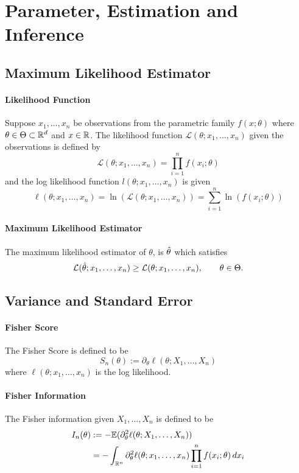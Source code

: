 \section{Parameter, Estimation and Inference}

\subsection{Maximum Likelihood Estimator}
\paragraph{Likelihood Function}
Suppose \(x_1, \dots, x_n\) be observations from the parametric family \(f(x; \theta)\) where \(\theta \in \Theta \subset \mathbb{R}^d\) and \(x \in \mathbb{R}\). The likelihood function \(\mathcal{L}(\theta; x_1, \dots, x_n)\) given the observations is defined by
\[\mathcal{L}(\theta; x_1, \dots, x_n) = \prod_{i=1}^n f(x_i;\theta) \]
and the log likelihood function \(l(\theta; x_1, \dots, x_n)\) is given
\[\ell(\theta; x_1, \dots, x_n) = \ln(\mathcal{L}(\theta; x_1, \dots, x_n)) = \sum_{i=1}^n \ln(f(x_i; \theta))\]

\paragraph{Maximum Likelihood Estimator}
The maximum likelihood estimator of \(\theta\), is \(\hat{\theta}\) which satisfies
\[\mathcal{L}(\hat{\theta}; x_1, \dots, x_n) \geq \mathcal{L}(\theta; x_1, \dots, x_n), \qquad \theta \in \Theta.\]

\subsection{Variance and Standard Error}

\paragraph{Fisher Score}
The Fisher Score is defined to be 
\[S_n(\theta) := \partial_\theta \ell(\theta; X_1, \dots, X_n)\]
where \(\ell(\theta; x_1, \dots, x_n)\) is the log likelihood.

\paragraph{Fisher Information}
The Fisher information given \(X_1, \dots, X_n\) is defined to be
\begin{align*}
    I_n(\theta) & := -\mathbb{E}(\partial_\theta^2 \ell(\theta; X_1, \dots, X_n)) \\
    & = -\int_{\mathbb{R}^n} \partial_\theta^2 \ell(\theta; x_1, \dots, x_n) \prod_{i=1}^n f(x_i;\theta) \, dx_i
\end{align*}

